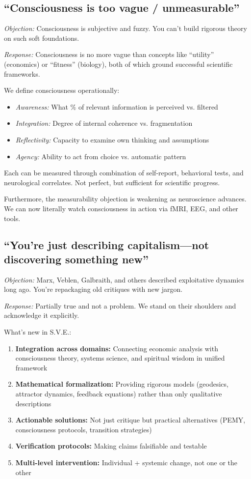 \documentclass[11pt,a4paper]{article}
\theoremstyle{definition}
\theoremstyle{remark}
\begin{document}
\subsection{``Consciousness is too vague / unmeasurable''}

\textit{Objection:} Consciousness is subjective and fuzzy. You can't build rigorous theory on such soft foundations.

\textit{Response:} Consciousness is no more vague than concepts like ``utility'' (economics) or ``fitness'' (biology), both of which ground successful scientific frameworks.

We define consciousness operationally:
\begin{itemize}
    \item \textit{Awareness:} What \% of relevant information is perceived vs. filtered
    \item \textit{Integration:} Degree of internal coherence vs. fragmentation
    \item \textit{Reflectivity:} Capacity to examine own thinking and assumptions
    \item \textit{Agency:} Ability to act from choice vs. automatic pattern
\end{itemize}

Each can be measured through combination of self-report, behavioral tests, and neurological correlates. Not perfect, but sufficient for scientific progress.

Furthermore, the measurability objection is weakening as neuroscience advances. We can now literally watch consciousness in action via fMRI, EEG, and other tools.

\subsection{``You're just describing capitalism---not discovering something new''}

\textit{Objection:} Marx, Veblen, Galbraith, and others described exploitative dynamics long ago. You're repackaging old critiques with new jargon.

\textit{Response:} Partially true and not a problem. We stand on their shoulders and acknowledge it explicitly.

What's new in S.V.E.:
\begin{enumerate}
    \item \textbf{Integration across domains:} Connecting economic analysis with consciousness theory, systems science, and spiritual wisdom in unified framework
    \item \textbf{Mathematical formalization:} Providing rigorous models (geodesics, attractor dynamics, feedback equations) rather than only qualitative descriptions
    \item \textbf{Actionable solutions:} Not just critique but practical alternatives (PEMY, consciousness protocols, transition strategies)
    \item \textbf{Verification protocols:} Making claims falsifiable and testable
    \item \textbf{Multi-level intervention:} Individual + systemic change, not one or the other
\end{enumerate}
\end{document}
